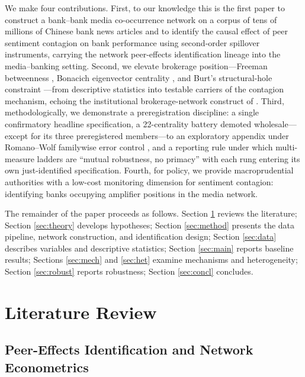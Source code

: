 We make four contributions. First, to our knowledge this is the
first paper to construct a bank--bank media co-occurrence network on
a corpus of tens of millions of Chinese bank news articles and to
identify the causal effect of peer sentiment contagion on bank
performance using second-order spillover instruments, carrying the
network peer-effects identification lineage
\parencite{bramoulle2009identification,bramoulle2020peer,boucher2024general}
into the media--banking setting. Second, we elevate brokerage
position---Freeman betweenness \parencite{freeman1978centrality},
Bonacich eigenvector centrality \parencite{bonacich1972factoring},
and Burt's structural-hole constraint
\parencite{burt1992structural}---from descriptive statistics into
testable carriers of the contagion mechanism, echoing the
institutional brokerage-network construct of
\textcite{han2024brokerage}. Third, methodologically, we demonstrate
a preregistration discipline: a single confirmatory headline
specification, a 22-centrality battery demoted wholesale---except
for its three preregistered members---to an exploratory appendix
under Romano--Wolf familywise error control
\parencite{romano2005stepwise}, and a reporting rule under which
multi-measure ladders are ``mutual robustness, no primacy'' with
each rung entering its own just-identified specification. Fourth,
for policy, we provide macroprudential authorities with a low-cost
monitoring dimension for sentiment contagion: identifying banks
occupying amplifier positions in the media network.

The remainder of the paper proceeds as follows. Section
\ref{sec:lit} reviews the literature; Section \ref{sec:theory}
develops hypotheses; Section \ref{sec:method} presents the data
pipeline, network construction, and identification design; Section
\ref{sec:data} describes variables and descriptive statistics;
Section \ref{sec:main} reports baseline results; Sections
\ref{sec:mech} and \ref{sec:het} examine mechanisms and
heterogeneity; Section \ref{sec:robust} reports robustness; Section
\ref{sec:concl} concludes.

\section{Literature Review}\label{sec:lit}

\subsection{Peer-Effects Identification and Network Econometrics}

